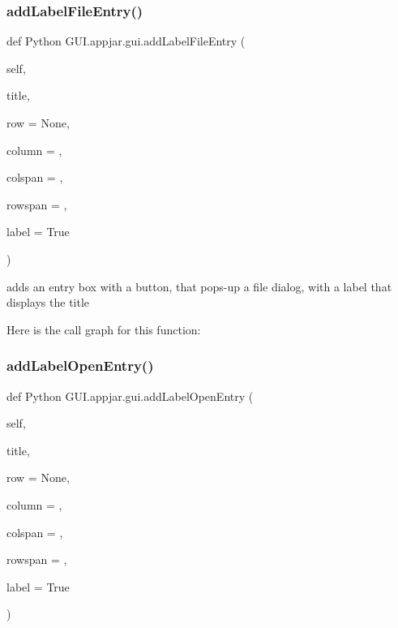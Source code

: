 \subsubsection{\texorpdfstring{add\+Label\+File\+Entry()}{addLabelFileEntry()}}
{\footnotesize\ttfamily def Python G\+U\+I.\+appjar.\+gui.\+add\+Label\+File\+Entry (\begin{DoxyParamCaption}\item[{}]{self,  }\item[{}]{title,  }\item[{}]{row = {\ttfamily None},  }\item[{}]{column = {},  }\item[{}]{colspan = {},  }\item[{}]{rowspan = {},  }\item[{}]{label = {\ttfamily True} }\end{DoxyParamCaption})}

\begin{DoxyVerb}adds an entry box with a button, that pops-up a file dialog, with a label that displays the title \end{DoxyVerb}
 Here is the call graph for this function\+:
\mbox{\label{class_python_01_g_u_i_1_1appjar_1_1gui_a16812ec4acad39a305a966bdbb04fc87}} 
\subsubsection{\texorpdfstring{add\+Label\+Open\+Entry()}{addLabelOpenEntry()}}
{\footnotesize\ttfamily def Python G\+U\+I.\+appjar.\+gui.\+add\+Label\+Open\+Entry (\begin{DoxyParamCaption}\item[{}]{self,  }\item[{}]{title,  }\item[{}]{row = {\ttfamily None},  }\item[{}]{column = {},  }\item[{}]{colspan = {},  }\item[{}]{rowspan = {},  }\item[{}]{label = {\ttfamily True} }\end{DoxyParamCaption})}

